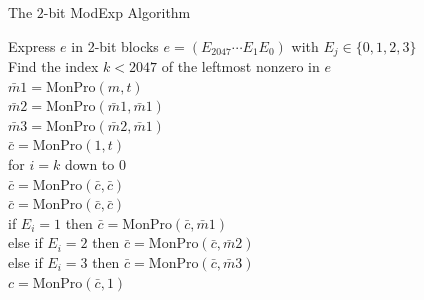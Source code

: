 \documentclass[xcolor=dvipsnames]{beamer}
\begin{document}
\begin{frame}{The $2$-bit ModExp Algorithm}

\hspace*{2em} Express $e$ in 2-bit blocks $e=(E_{2047}\cdots E_1E_0)$ with
$E_j \in \{0,1,2,3\}$ \\
\hspace*{2em} Find the index $k<2047$ of the leftmost nonzero in $e$ \\
\hspace*{2em} $\bar{m}1=\mbox{MonPro}(m,t)$ \\
\hspace*{2em} $\bar{m}2=\mbox{MonPro}(\bar{m}1,\bar{m}1)$ \\
\hspace*{2em} $\bar{m}3=\mbox{MonPro}(\bar{m}2,\bar{m}1)$ \\
\hspace*{2em} $\bar{c}=\mbox{MonPro}(1,t)$ \\
\hspace*{2em} for $i=k$ down to $0$ \\
\hspace*{2em} \hspace*{2em} $\bar{c}=\mbox{MonPro}(\bar{c},\bar{c})$ \\
\hspace*{2em} \hspace*{2em} $\bar{c}=\mbox{MonPro}(\bar{c},\bar{c})$ \\
\hspace*{2em} \hspace*{2em} if $E_i=1$ then $\bar{c}=\mbox{MonPro}(\bar{c},\bar{m}1)$ \\
\hspace*{2em} \hspace*{3em} else if $E_i=2$ then $\bar{c}=\mbox{MonPro}(\bar{c},\bar{m}2)$ \\
\hspace*{2em} \hspace*{4em} else if $E_i=3$ then $\bar{c}=\mbox{MonPro}(\bar{c},\bar{m}3)$ \\
\hspace*{2em} $c=\mbox{MonPro}(\bar{c},1)$

\end{frame}
\end{document}
